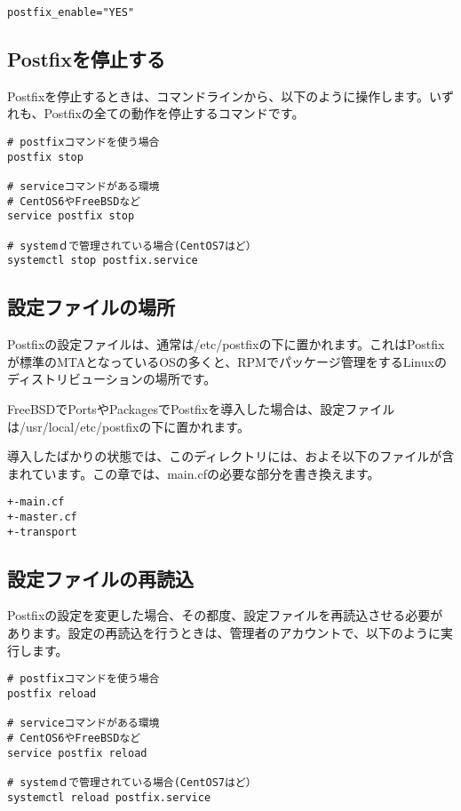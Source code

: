 \begin{lstlisting}[basicstyle=\ttfamily\footnotesize, frame=single]
postfix_enable="YES"
\end{lstlisting}

\subsection{Postfixを停止する}
Postfixを停止するときは、コマンドラインから、以下のように操作します。いずれも、Postfixの全ての動作を停止するコマンドです。

\begin{lstlisting}[basicstyle=\ttfamily\footnotesize, frame=single]
# postfixコマンドを使う場合
postfix stop

# serviceコマンドがある環境
# CentOS6やFreeBSDなど
service postfix stop

# systemｄで管理されている場合(CentOS7はど）
systemctl stop postfix.service
\end{lstlisting}

\subsection{設定ファイルの場所}

Postfixの設定ファイルは、通常は/etc/postfixの下に置かれます。これはPostfixが標準のMTAとなっているOSの多くと、RPMでパッケージ管理をするLinuxのディストリビューションの場所です。

FreeBSDでPortsやPackagesでPostfixを導入した場合は、設定ファイルは/usr/local/etc/postfixの下に置かれます。

導入したばかりの状態では、このディレクトリには、およそ以下のファイルが含まれています。この章では、main.cfの必要な部分を書き換えます。

\begin{lstlisting}[basicstyle=\ttfamily\footnotesize, frame=single]
+-main.cf
+-master.cf
+-transport
\end{lstlisting}

\subsection{設定ファイルの再読込}
Postfixの設定を変更した場合、その都度、設定ファイルを再読込させる必要があります。設定の再読込を行うときは、管理者のアカウントで、以下のように実行します。

\begin{lstlisting}[basicstyle=\ttfamily\footnotesize, frame=single]
# postfixコマンドを使う場合
postfix reload

# serviceコマンドがある環境
# CentOS6やFreeBSDなど
service postfix reload

# systemｄで管理されている場合(CentOS7はど）
systemctl reload postfix.service
\end{lstlisting}

